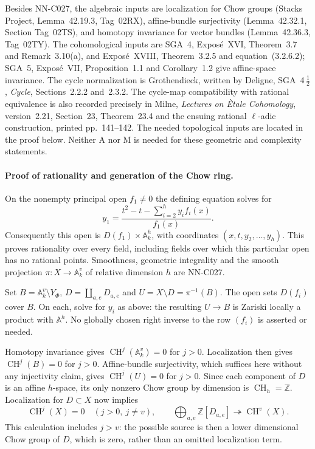 Besides NN-C027, the algebraic inputs are localization for Chow groups
(Stacks Project, Lemma~42.19.3, Tag~02RX), affine-bundle surjectivity
(Lemma~42.32.1, Section Tag~02TS), and homotopy invariance for vector bundles
(Lemma~42.36.3, Tag~02TY). The cohomological inputs are SGA~4, Expos\'e~XVI,
Theorem~3.7 and Remark~3.10(a), and Expos\'e~XVIII, Theorem~3.2.5 and
equation~(3.2.6.2); SGA~5, Expos\'e~VII, Proposition~1.1 and Corollary~1.2
give affine-space invariance. The cycle normalization is Grothendieck,
written by Deligne, SGA~4\,$\frac12$, \emph{Cycle}, Sections~2.2.2 and~2.3.2.
The cycle-map compatibility with rational equivalence is also recorded
precisely in Milne, \emph{Lectures on \`Etale Cohomology}, version~2.21,
Section~23, Theorem~23.4 and the ensuing rational $\ell$-adic construction,
printed pp.~141--142.
The needed topological inputs are located in the proof below.
Neither A nor M is needed for these geometric and complexity statements.

\paragraph{Proof of rationality and generation of the Chow ring.}
On the nonempty principal open $f_1\ne0$ the defining equation solves for
\[
 y_1=\frac{t^2-t-\sum_{i=2}^h y_i f_i(x)}{f_1(x)}.
\]
Consequently this open is $D(f_1)\times\mathbb A^h_k$, with coordinates
$(x,t,y_2,\ldots,y_h)$. This proves rationality over every field, including
fields over which this particular open has no rational points. Smoothness,
geometric integrality and the smooth projection
$\pi:X\to\mathbb A^v_k$ of relative dimension $h$ are NN-C027.

Set $B=\mathbb A^v_k\setminus Y_\Phi$, $D=\coprod_{a,e}D_{a,e}$ and
$U=X\setminus D=\pi^{-1}(B)$. The open sets $D(f_i)$ cover $B$.
On each, solve for $y_i$ as above: the resulting $U\to B$ is Zariski
locally a product with $\mathbb A^h$. No globally chosen right inverse
to the row $(f_i)$ is asserted or needed.

Homotopy invariance gives $\operatorname{CH}^j(\mathbb A^v_k)=0$ for
$j>0$. Localization then gives $\operatorname{CH}^j(B)=0$ for $j>0$.
Affine-bundle surjectivity, which suffices here without any injectivity
claim, gives $\operatorname{CH}^j(U)=0$ for $j>0$. Since each component
of $D$ is an affine $h$-space, its only nonzero Chow group by dimension
is $\operatorname{CH}_h=\mathbb Z$. Localization for $D\subset X$ now
implies
\[
 \operatorname{CH}^j(X)=0\quad(j>0,\ j\ne v),\qquad
 \bigoplus_{a,e}\mathbb Z[D_{a,e}]\twoheadrightarrow
                            \operatorname{CH}^v(X).
\]
This calculation includes $j>v$: the possible source is then a lower
dimensional Chow group of $D$, which is zero, rather than an omitted
localization term.

